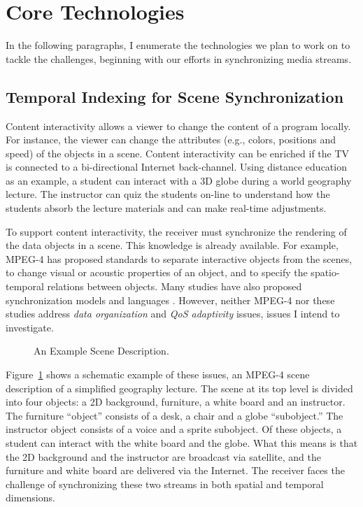 \section{Core Technologies}
\label{sec-core}

In the following paragraphs, I enumerate the technologies
we plan to work on to tackle the challenges, 
beginning with our efforts in synchronizing media streams.

\subsection{Temporal Indexing for Scene Synchronization}

Content interactivity allows a viewer to change the content
of a program locally. For instance, the viewer can change
the attributes (e.g., colors, positions and speed)
of the objects in a scene. 
Content interactivity can be enriched if the TV is connected
to a bi-directional Internet back-channel.
Using distance education as an example,
a student can interact with a 3D globe
during a world geography lecture.
The instructor can quiz the students on-line to understand 
how the students absorb the lecture materials and can make real-time
adjustments.

To support content interactivity, the receiver must synchronize
the rendering of the data objects in a scene. 
This knowledge is already available.
For example, MPEG-4 \cite{Mp4} has proposed standards to
separate interactive objects from the scenes, to change
visual or acoustic properties of an object, and to
specify the spatio-temporal relations between objects.
Many studies have also proposed synchronization models
and languages \cite{Hyp92,Co96,Gr95,Ha96,HFK95,Hkm97}.
However, neither MPEG-4 nor these studies 
address {\em data organization}
and {\em QoS adaptivity} issues, issues I intend to investigate.

\begin{figure}[t]
\epsfysize=140pt
\centerline{}
\caption{An Example Scene Description.}
\label{fig-scene-desc}
\end{figure}
                  
Figure~\ref{fig-scene-desc} shows a schematic example of these issues,
an MPEG-4 scene description of a simplified geography
lecture. The scene at its top level is divided into four
objects: a 2D background, furniture, a white board and 
an instructor.
The furniture ``object'' consists of a desk, a chair and a globe
``subobject.''  The instructor object consists of a 
voice and a sprite subobject.  
Of these objects, a student 
can interact with the white board and the globe.
What this means is that the 2D background and the instructor 
are broadcast via satellite, and the furniture and white board
are delivered via the Internet. The receiver faces the
challenge of synchronizing
these two streams in both spatial and temporal dimensions.

